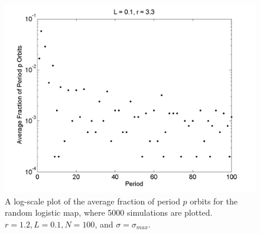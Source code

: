 \begin{figure}[H]\linespread{1}
\caption[Log-scale plot of the average fraction of period $p$ orbits for the random logistic
map, $\sigma=\sigma_{max}$ and $r=3.3$]{A log-scale plot of the average fraction of period $p$ orbits for the random logistic
map, where 5000 simulations are plotted. $r=1.2, L=0.1, N = 100$, and $\sigma=\sigma_{max}$.}\label{fig:rloghistlog}
	\begin{center}
\includegraphics[scale=0.55]{figs/rlog_hist_L_01_r_33_sims_5000semilogy.png}\hfill		\end{center}
\end{figure}
	
